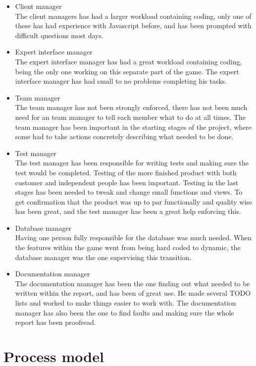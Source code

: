 \begin{itemize}
	\item Client manager\\
The client managers has had a larger workload containing coding, only one of these has had experience with Javascript before, and has been prompted with difficult questions most days.
	\item Expert interface manager\\
The expert interface manager has had a great workload containing coding, being the only one working on this separate part of the game. The expert interface manager has had small to no problems completing his tasks.
	\item Team manager\\
The team manager has not been strongly enforced, there has not been much need for an team manager to tell each member what to do at all times. The team manager has been important in the starting stages of the project, where some had to take actions concretely describing what needed to be done. 
	\item Test manager\\
The test manager has been responsible for writing tests and making sure the test would be completed. Testing of the more finished product with both customer and independent people has been important. Testing in the last stages has been needed to tweak and change small functions and views. To get confirmation that the product was up to par functionally and quality wise has been great, and the test manager has been a great help enforcing this.
	\item Database manager\\
Having one person fully responsible for the database was much needed. When the features within the game went from being hard coded to dynamic, the database manager was the one supervising this transition. 
	\item Documentation manager\\
The documentation manager has been the one finding out what needed to be written within the report, and has been of great use. He made several TODO lists and worked to make things easier to work with. The documentation manager has also been the one to find faults and making sure the whole report has been proofread.
\end{itemize}


\section{Process model}

